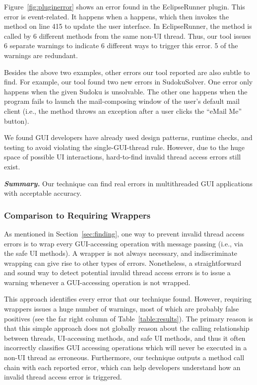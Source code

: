 Figure~\ref{fig:pluginerror} shows an error found in the EclipseRunner
plugin. This error is event-related. It happens when a 
 happens, which then invokes the 
method on line 415 to update the user interface. In EclipseRunner,
the  method is
called by 6 different methods from the same non-UI thread. Thus, our
tool issues 6 separate warnings to indicate
6 different ways to trigger this error. 5 of the warnings are redundant.

Besides the above two examples, other errors our tool reported are also
subtle to find. For example, our tool found two new errors in SudokuSolver.
One error only happens when
the given Sudoku is unsolvable.  The other one happens
when the program fails to launch the mail-composing window of the
user's default mail client (i.e., the 
method throws an exception after a user clicks the ``eMail Me'' button).

We found GUI developers have already
used design patterns, runtime checks, and testing to avoid violating
the single-GUI-thread rule. However, due to the huge space of
possible UI interactions, hard-to-find
invalid thread access errors still exist.


\vspace{1mm}

\noindent \textbf{\textit{Summary.}} Our technique can find real errors
in multithreaded GUI applications with
acceptable accuracy.

\subsubsection{Comparison to Requiring Wrappers}
\label{sec:straightforward}

As mentioned in Section~\ref{sec:finding}, one way to prevent
invalid thread access errors is to wrap every GUI-accessing operation
with message passing (i.e., via the safe UI methods).  A wrapper is not
always necessary, and indiscriminate wrapping
can give rise to other types of errors.  Nonetheless, a
straightforward and sound way to detect potential invalid thread access errors
is to issue a warning whenever a GUI-accessing operation
is not wrapped. 

This approach identifies every
error that our technique found.
However, requiring wrappers 
issues a huge number of warnings,
most of which are probably false positives (see the far right column of
Table~\ref{table:results}).
The primary reason is that this simple approach
does not globally reason about the calling relationship between
threads, UI-accessing methods, and safe UI methods, and thus it often incorrectly
classifies GUI accessing operations which will never be executed
in a non-UI thread as erroneous. Furthermore, our technique
outputs a method call chain with each reported error, which can help
developers understand how an invalid thread access error is triggered.



